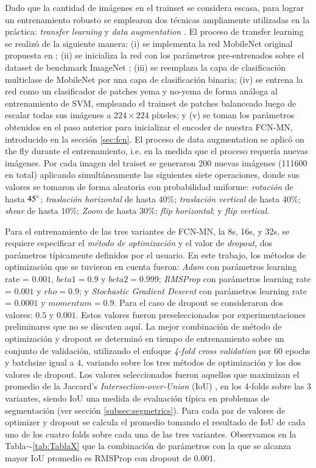 \documentclass[a4paper,authoryear,review]{elsarticle}
\begin{document}
	Dado que la cantidad de imágenes en el trainset se considera escasa, para lograr un entrenamiento robusto se emplearon dos técnicas ampliamente utilizadas en la práctica: \emph{transfer learning} \cite{pan2009survey} y \emph{data augmentation} \cite{shorten2019survey}. El proceso de transfer learning se realizó de la siguiente manera: (i) se implementa la red MobileNet original propuesta en \citet{howard2017mobilenets}; (ii) se inicializa la red con los parámetros pre-entrenados sobre el dataset de benchmark ImageNet \cite{kornblith2019better}; (iii) se reemplaza la capa de clasificación multiclase de MobileNet por una capa de clasificación binaria; (iv) se entrena la red como un clasificador de patches yema y no-yema de forma análoga al entrenamiento de SVM, empleando el trainset de patches balanceado luego de escalar todas sus imágenes a $224 \times 224$ píxeles; y (v) se toman los parámetros obtenidos en el paso anterior para inicializar el encoder de nuestra FCN-MN, introducido en la sección \ref{sec:fcn}. El proceso de data augmentation se aplicó on the fly durante el entrenamiento, i.e. en la medida que el proceso requería nuevas imágenes. Por cada imagen del traiset se generaron 200 nuevas imágenes (111600 en total) aplicando simultáneamente las siguientes siete operaciones, donde sus valores se tomaron de forma aleatoria con probabilidad uniforme: \emph{rotación} de hasta $45\degree$; \emph{traslación horizontal} de hasta $40\%$; \emph{traslación vertical} de hasta $40\%$; \emph{shear} de hasta $10\%$; \emph{Zoom} de hasta $30\%$; \emph{flip horizontal}; y \emph{flip vertical}. 
	
	Para el entrenamiento de las tres variantes de FCN-MN, la 8s, 16s, y 32s, se requiere especificar el \emph{método de optimización} y el valor de \emph{dropout}, dos parámetros típicamente definidos por el usuario. En este trabajo, los métodos de optimización que se tuvieron en cuenta fueron: \emph{Adam} con parámetros learning rate = $0.001$, $beta1 = 0.9$ y $beta2 = 0.999$; \emph{RMSProp} con parámetros learning rate = $0.001$ y $rho = 0.9$; y \emph{Stochastic Gradient Descent} con parámetros learning rate = $0.0001$ y $momentum = 0.9$. Para el caso de dropout se consideraron dos valores: $0.5$ y $0.001$. Estos valores fueron preseleccionados por experimentaciones preliminares que no se discuten aquí.
	La mejor combinación de método de optimización y dropout se determinó en tiempo de entrenamiento sobre un conjunto de validación, utilizando el enfoque \emph{4-fold cross validation} por 60 epochs y batchsize igual a $4$, variando sobre los tres métodos de optimización y los dos valores de dropout. Los valores seleccionados fueron aquellos que maximizan el promedio de la Jaccard’s \emph{Intersection-over-Union} (IoU) \citep{jaccard1912distribution},  en los 4-folds sobre las 3 variantes, siendo IoU una medida de evaluación típica en problemas de segmentación (ver sección \ref{subsec:segmetrics}). Para cada par de valores de optimizer y dropout se calcula el promedio tomando el resultado de IoU de cada uno de los cuatro folds sobre cada una de las tres variantes. Observamos en la Tabla$\sim$\ref{tab:TablaX} que la combinación de parámetros con la que se alcanza mayor IoU promedio es RMSProp con dropout de $0.001$. 
	
\end{document}
